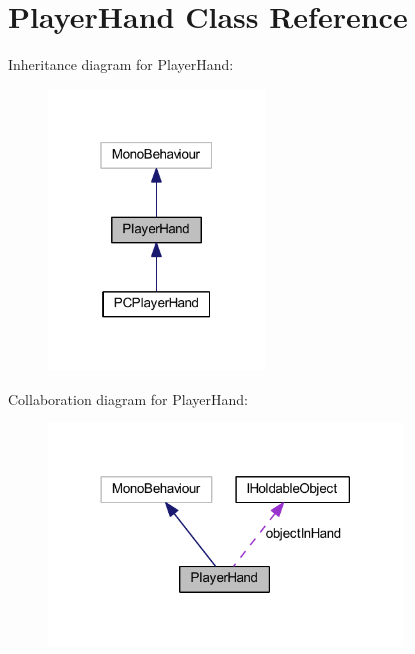 \hypertarget{class_player_hand}{}\section{Player\+Hand Class Reference}
\label{class_player_hand}


Inheritance diagram for Player\+Hand\+:
\nopagebreak
\begin{figure}[H]
\begin{center}
\leavevmode
\includegraphics[width=163pt]{class_player_hand__inherit__graph}
\end{center}
\end{figure}


Collaboration diagram for Player\+Hand\+:
\nopagebreak
\begin{figure}[H]
\begin{center}
\leavevmode
\includegraphics[width=266pt]{class_player_hand__coll__graph}
\end{center}
\end{figure}
